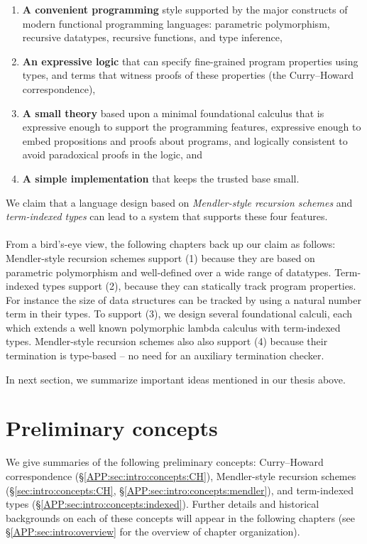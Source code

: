 \begin{enumerate}[(1)]
 \item \textbf{A convenient programming} style
         supported by the major constructs of
         modern functional programming languages: 
         parametric polymorphism, recursive datatypes,
         recursive functions, and type inference,
 \item \textbf{An expressive logic}
         that can specify fine-grained program properties using types, and terms that
         witness proofs of these properties 
         (the Curry--Howard correspondence),
 \item \textbf{A small theory} based upon a minimal foundational calculus that is
         expressive enough to support the programming features, expressive
         enough to embed propositions and proofs about
         programs, and logically consistent
         to avoid paradoxical proofs in the logic, and
 \item \textbf{A simple implementation} that keeps the trusted base small.
\end{enumerate}
We claim that a language design based on \emph{Mendler-style recursion schemes}
and \emph{term-indexed types} can lead to a system that supports these four
features.

\paragraph{}
From a bird's-eye view, the following chapters back up our claim as follows:
Mendler-style recursion schemes support (1) because they are based on
parametric polymorphism and well-defined over a wide range of datatypes.
Term-indexed types support (2), because they can statically track program
properties. For instance the size of data structures can be tracked by using
a natural number term in their types.
To support (3), we design several foundational calculi, each which extends
a well known polymorphic lambda calculus with term-indexed types.
Mendler-style recursion schemes also also support (4) because their
termination is type-based -- no need for an auxiliary termination checker.

In next section, we summarize important ideas mentioned in our thesis above.

\section{Preliminary concepts}\label{APP:sec:intro:concepts}
We give summaries of the following preliminary concepts:
Curry--Howard correspondence (\S\ref{APP:sec:intro:concepts:CH}),
Mendler-style recursion schemes
(\S\ref{sec:intro:concepts:CH}, \S\ref{APP:sec:intro:concepts:mendler}),
and term-indexed types (\S\ref{APP:sec:intro:concepts:indexed}).
Further details and historical backgrounds on each of these concepts
will appear in the following chapters (see \S\ref{APP:sec:intro:overview}
for the overview of chapter organization).

